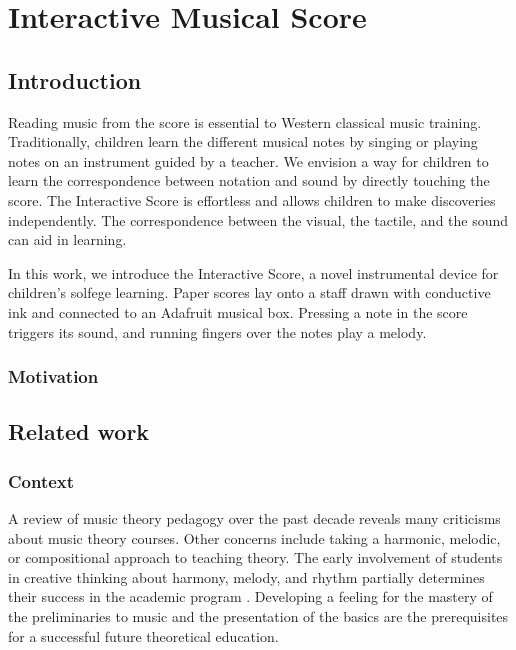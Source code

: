 \chapter{Interactive Musical Score}

\section{Introduction}

Reading music from the score is essential to Western classical music training. Traditionally, children learn the different musical notes by singing or playing notes on an instrument guided by a teacher. We envision a way for children to learn the correspondence between notation and sound by directly touching the score.
The Interactive Score is effortless and allows children to make discoveries independently. The correspondence between the visual, the tactile, and the sound can aid in learning.

In this work, we introduce the Interactive Score, a novel instrumental device for children's solfege learning. Paper scores lay onto a staff drawn with conductive ink and connected to an Adafruit musical box. Pressing a note in the score triggers its sound, and running fingers over the notes play a melody.


\subsection*{Motivation}

\section{Related work}

\subsection{Context}

A review of music theory pedagogy over the past decade reveals many criticisms about music theory courses. Other concerns include taking a harmonic, melodic, or compositional approach to teaching theory. The early involvement of students in creative thinking about harmony, melody, and rhythm partially determines their success in the academic program \cite{bland1977college}. Developing a feeling for the mastery of the preliminaries to music and the presentation of the basics are the prerequisites for a successful future theoretical education.

